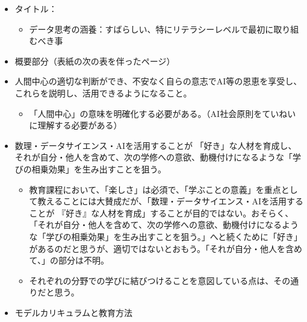 \documentclass[
]{book}
\providecommand{\tightlist}{%
  \setlength{\itemsep}{0pt}\setlength{\parskip}{0pt}}
\theoremstyle{definition}
\theoremstyle{definition}
\theoremstyle{definition}
\theoremstyle{definition}
\theoremstyle{remark}
\begin{document}
\begin{itemize}
\tightlist
\item
  タイトル：

  \begin{itemize}
  \tightlist
  \item
    データ思考の涵養：すばらしい、特にリテラシーレベルで最初に取り組むべき事
  \end{itemize}
\item
  概要部分（表紙の次の表を伴ったページ）
\item
  人間中心の適切な判断ができ、不安なく自らの意志でAI等の恩恵を享受し、これらを説明し、活用できるようになること。

  \begin{itemize}
  \tightlist
  \item
    「人間中心」の意味を明確化する必要がある。（AI社会原則をていねいに理解する必要がある）
  \end{itemize}
\item
  数理・データサイエンス・AIを活用することが 「好き」な人材を育成し、それが自分・他人を含めて、次の学修への意欲、動機付けになるような「学びの相乗効果」を生み出すことを狙う。

  \begin{itemize}
  \tightlist
  \item
    教育課程において、「楽しさ」は必須で、「学ぶことの意義」を重点として教えることには大賛成だが、「数理・データサイエンス・AIを活用することが 『好き』な人材を育成」することが目的ではない。おそらく、「それが自分・他人を含めて、次の学修への意欲、動機付けになるような「学びの相乗効果」を生み出すことを狙う。」へと続くために「好き」があるのだと思うが、適切ではないとおもう。「それが自分・他人を含めて、」の部分は不明。
  \item
    それぞれの分野での学びに結びつけることを意図している点は、その通りだと思う。
  \end{itemize}
\item
  モデルカリキュラムと教育方法


\end{itemize}
\end{document}
